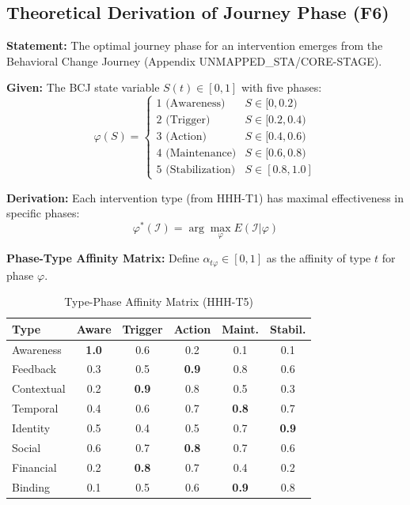 \subsection{Theoretical Derivation of Journey Phase (F6)}
\label{sec:hhh-phase}

\begin{tcolorbox}[colback=blue!5!white, colframe=blue!75!black,
    title=\textbf{Theorem HHH-T5: Journey Phase Emergence from STAGE}]

\textbf{Statement:} The optimal journey phase for an intervention emerges from the Behavioral Change Journey (Appendix UNMAPPED_STA/CORE-STAGE).

\textbf{Given:} The BCJ state variable $S(t) \in [0, 1]$ with five phases:
\begin{equation}
\varphi(S) = \begin{cases}
1 \text{ (Awareness)} & S \in [0, 0.2) \\
2 \text{ (Trigger)} & S \in [0.2, 0.4) \\
3 \text{ (Action)} & S \in [0.4, 0.6) \\
4 \text{ (Maintenance)} & S \in [0.6, 0.8) \\
5 \text{ (Stabilization)} & S \in [0.8, 1.0]
\end{cases}
\end{equation}

\textbf{Derivation:} Each intervention type (from HHH-T1) has maximal effectiveness in specific phases:
\begin{equation}
\varphi^*(\mathcal{I}) = \arg\max_{\varphi} E(\mathcal{I} | \varphi)
\label{eq:hhh-phase-mapping}
\end{equation}

\textbf{Phase-Type Affinity Matrix:} Define $\alpha_{t\varphi} \in [0,1]$ as the affinity of type $t$ for phase $\varphi$.

\end{tcolorbox}

\begin{table}[htbp]
\centering
\caption{Type-Phase Affinity Matrix (HHH-T5)}
\label{tab:hhh-phase-affinity}
\renewcommand{\arraystretch}{1.2}
\small
\begin{tabular}{@{}l|ccccc@{}}
\toprule
\textbf{Type} & \textbf{Aware} & \textbf{Trigger} & \textbf{Action} & \textbf{Maint.} & \textbf{Stabil.} \\
\midrule
Awareness & \textbf{1.0} & 0.6 & 0.2 & 0.1 & 0.1 \\
Feedback & 0.3 & 0.5 & \textbf{0.9} & 0.8 & 0.6 \\
Contextual & 0.2 & \textbf{0.9} & 0.8 & 0.5 & 0.3 \\
Temporal & 0.4 & 0.6 & 0.7 & \textbf{0.8} & 0.7 \\
Identity & 0.5 & 0.4 & 0.5 & 0.7 & \textbf{0.9} \\
Social & 0.6 & 0.7 & \textbf{0.8} & 0.7 & 0.6 \\
Financial & 0.2 & \textbf{0.8} & 0.7 & 0.4 & 0.2 \\
Binding & 0.1 & 0.5 & 0.6 & \textbf{0.9} & 0.8 \\
\bottomrule
\end{tabular}
\end{table}


